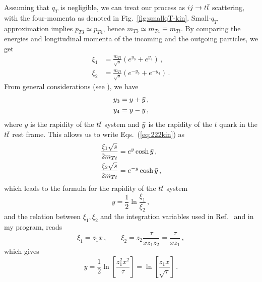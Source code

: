 \documentclass[a4paper,11pt]{report}
\numberwithin{equation}{section}
\begin{document}
Assuming that $q_T$ is negligible, we can treat our process as $ij \to t \bar t$
scattering, with the four-momenta as denoted in Fig.~\ref{fig:smallqT-kin}.
%
Small-$q_T$ approximation implies $p_{T3} \simeq p_{T4}$, hence
$m_{T3} \simeq m_{T4} \equiv m_{Tt}$. By comparing the energies and longitudinal
momenta of the incoming and the outgoing particles, we get
%
\begin{subequations}
  \label{eq:222kin}
  \begin{align}
  \xi_1 & =  \frac{m_{Tt}}{\sqrt{s}} \left(e^{y_3} + e^{y_4}\right)\,,
  \\
  \xi_2 & =  \frac{m_{Tt}}{\sqrt{s}} \left(e^{-y_3} + e^{-y_4}\right)\,.
  \end{align}
\end{subequations}
%
From general considerations (see \eg \cite{Ellis}), we have
%
\begin{subequations}
  \begin{align}
  y_3 & = y + {\bar y} \,, \\
  y_4 & = y - {\bar y} \,,
  \end{align}
\end{subequations}
%
where $y$ is the rapidity of the $t \bar t$ system and ${\bar y}$ is the rapidity of
the $t$ quark in the $t \bar t$ rest frame. This allows us to write
Eqs.~(\ref{eq:222kin}) as
%
\begin{subequations}
  \begin{align}
  \frac{\xi_1 \sqrt{s}}{2 m_{Tt}} & = e^{y} \cosh {\bar y}\,, \\
  \frac{\xi_2 \sqrt{s}}{2 m_{Tt}} & = e^{-y} \cosh {\bar y}\,,
  \end{align}
\end{subequations}
%
which leads to the formula for the rapidity of the $t \bar t$ system
%
\begin{equation}
  y = \frac12 \ln\frac{\xi_1}{\xi_2}\,,
\end{equation}
and the relation between $\xi_1, \xi_2$ and the integration variables used in
Ref.~\cite{Li:2013mia} and in my program, reads
%
\begin{equation}
  \xi_1 = z_1 x\,, \qquad
  \xi_2  = z_2 \frac{\tau}{xz_1 z_2} = \frac{\tau}{xz_1}\,,
\end{equation}
%
which gives
\begin{equation}
  y = \frac12 \ln \left[\frac{z_1^2 x^2 }{\tau} \right]
    = \ln \left[\frac{z_1 x }{\sqrt{\tau}} \right]\,.
\end{equation}
\end{document}

